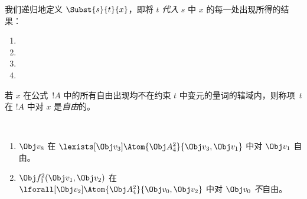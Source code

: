 \documentclass[../../../include/open-logic-section]{subfiles}
\begin{document}


\begin{defn}[项中的代入]
我们递归地定义 $\Subst{s}{t}{x}$，即将 $t$ \emph{代入} $s$ 中 $x$ 的每一处出现所得的结果：
\begin{enumerate}
\item {}

\item {}

\item {}

\item{}
\end{enumerate}
\end{defn}

\begin{defn}
若 $x$ 在公式~$!A$ 中的所有自由出现均不在约束 $t$ 中变元的量词的辖域内，则称项~$t$ 在 $!A$ 中对 $x$ 是\emph{自由}的。
\end{defn}

\begin{ex} ~
\begin{enumerate}
\item $\Obj v_8$ 在 $\lexists[\Obj
  v_3]\Atom{\Obj A^2_4}{\Obj v_3,\Obj v_1}$ 中对 $\Obj v_1$ 自由。

\item $\Obj f^2_1(\Obj v_1, \Obj v_2)$ 在 $\lforall[\Obj v_2]\Atom{\Obj A^2_4}{\Obj v_0,\Obj v_2}$ 中对 $\Obj v_0$ \emph{不}自由。
\end{enumerate}
\end{ex}
\end{document}
